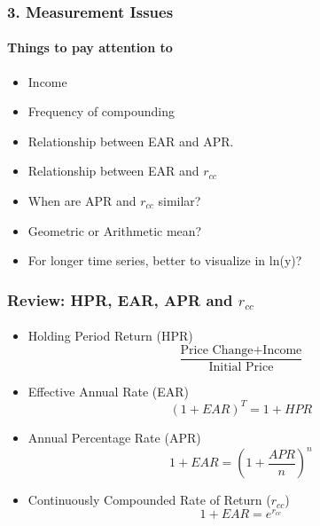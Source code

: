 \documentclass{beamer}
\begin{document}
\begin{frame}[t]
    \frametitle{3. Measurement Issues}
    \framesubtitle{Things to pay attention to}

    \begin{itemize}
        \item Income
        \item Frequency of compounding
        \item Relationship between EAR and APR.
        \item Relationship between EAR and $r_{cc}$
        \item When are APR and $r_{cc}$ similar?
        \item Geometric or Arithmetic mean?
        \item For longer time series, better to visualize in ln(y)?
    \end{itemize}
    

\end{frame}

\begin{practiceframe}[t]
  \frametitle{Review: HPR, EAR, APR and $r_{cc}$}
  \framesubtitle{}

  \begin{itemize}
    \item Holding Period Return (HPR)
    $$\frac{\text{Price Change} + \text{Income}}{\text{Initial Price}}$$
    \item Effective Annual Rate (EAR)
    $$(1 + EAR)^T = 1 + HPR$$
    \item Annual Percentage Rate (APR)
    $$1+EAR = \left(1 + \frac{APR}{n}\right)^n$$
    \item Continuously Compounded Rate of Return ($r_{cc}$)
    $$1+EAR = e^{r_{cc}}$$
  \end{itemize}

\end{practiceframe}
\end{document}
